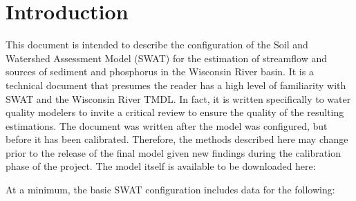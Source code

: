 \section{Introduction}
This document is intended to describe the configuration of the Soil and Watershed Assessment Model (SWAT) for the estimation of streamflow and sources of sediment and phosphorus in the Wisconsin River basin. It is a technical document that presumes the reader has a high level of familiarity with SWAT and the Wisconsin River TMDL. In fact, it is written specifically to water quality modelers to invite a critical review to ensure the quality of the resulting estimations. The document was written after the model was configured, but before it has been calibrated. Therefore, the methods described here may change prior to the release of the final model given new findings during the calibration phase of the project. The model itself is available to be downloaded here:

At a minimum, the basic SWAT configuration includes data for the following:

